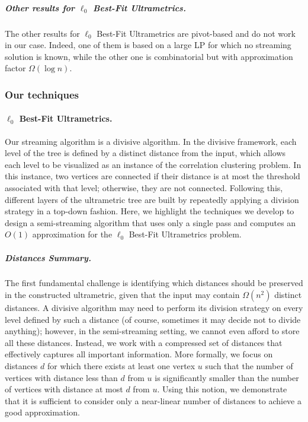 \documentclass{article}
\begin{document}
\subparagraph{Other results for $\ell_0$ Best-Fit Ultrametrics.} The other results for $\ell_0$ Best-Fit Ultrametrics are pivot-based and do not work in our case. Indeed, one of them \cite{CharikarG24} is based on a large LP for which no streaming solution is known, while the other one \cite{cohen2022fitting} is combinatorial but with approximation factor $\Omega(\log{n})$.


\subsubsection{Our techniques}\label{section:techniques}

\paragraph*{$\ell_0$ Best-Fit Ultrametrics.}
Our streaming algorithm is a divisive algorithm.
In the divisive framework, each level of the tree is defined by a distinct distance from the input, which allows each level to be visualized as an instance of the correlation clustering problem.
In this instance, two vertices are connected if their distance is at most the threshold associated with that level; otherwise, they are not connected.
Following this, different layers of the ultrametric tree are built by repeatedly applying a division strategy in a top-down fashion.
Here, we highlight the techniques we develop to design a semi-streaming algorithm that uses only a single pass and computes an $O(1)$ approximation for the $\ell_0$ Best-Fit Ultrametrics problem.


\subparagraph*{Distances Summary.} 

The first fundamental challenge is identifying which distances should be preserved in the constructed ultrametric, given that the input may contain $\Omega(n^2)$ distinct distances.
A divisive algorithm may need to perform its division strategy on every level defined by such a distance (of course, sometimes it may decide not to divide anything); however, in the semi-streaming setting, we cannot even afford to store all these distances. 
Instead, we work with a compressed set of distances that effectively captures all important information. More formally, we focus on distances \(d\) for which there exists at least one vertex \(u\) such that the number of vertices with distance less than \(d\) from \(u\) is significantly smaller than the number of vertices with distance at most \(d\) from \(u\). Using this notion, we demonstrate that it is sufficient to consider only a near-linear number of distances to achieve a good approximation.
\end{document}
